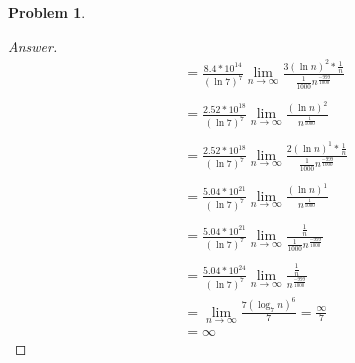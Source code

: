 \documentclass[11pt]{article}
\theoremstyle{definition}
\theoremstyle{definition}
\newtheorem{required}{Problem}
\theoremstyle{definition}
\begin{document}
\begin{required}
\begin{enumerate} [label=(\alph*)]
\begin{proof}[Answer]
\begin{align*}
&= \frac{8.4*10^{14}}{(\ln 7)^{7}}\lim_{n \to \infty} \frac{3(\ln n)^{2} * \frac{1}{n}}{\frac{1}{1000}n^{\frac{-999}{1000}}} \\
\\
&= \frac{2.52*10^{18}}{(\ln 7)^{7}}\lim_{n \to \infty} \frac{(\ln n)^{2}}{n^{\frac{1}{1000}}} \\
\\
&= \frac{2.52*10^{18}}{(\ln 7)^{7}}\lim_{n \to \infty} \frac{2(\ln n)^{1} * \frac{1}{n}}{\frac{1}{1000}n^{\frac{-999}{1000}}} \\
\\
&= \frac{5.04*10^{21}}{(\ln 7)^{7}}\lim_{n \to \infty} \frac{(\ln n)^{1}}{n^{\frac{1}{1000}}} \\
\\
&= \frac{5.04*10^{21}}{(\ln 7)^{7}}\lim_{n \to \infty} \frac{\frac{1}{n}}{\frac{1}{1000}n^{\frac{-999}{1000}}} \\
\\
&= \frac{5.04*10^{24}}{(\ln 7)^{7}}\lim_{n \to \infty} \frac{\frac{1}{n}}{n^{\frac{-999}{1000}}} \\
&= \lim_{n \to \infty} \frac{7(\log_7 n)^6}{7} = \frac{\infty}{7}\\
&= \infty
\end{align*} 
    \end{proof}
\end{enumerate}

\end{required}

\newpage
\end{document}
